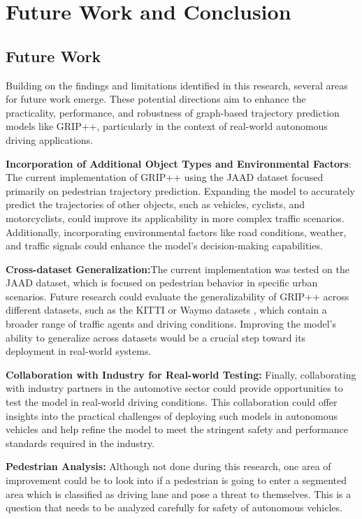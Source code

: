\chapter{Future Work and Conclusion}

\section{Future Work}

\tab Building on the findings and limitations identified in this research, several areas for future work emerge. These potential directions aim to enhance the practicality, performance, and robustness of graph-based trajectory prediction models like GRIP++, particularly in the context of real-world autonomous driving applications.

\textbf{Incorporation of Additional Object Types and Environmental Factors}: The current implementation of GRIP++ using the JAAD dataset focused primarily on pedestrian trajectory prediction. Expanding the model to accurately predict the trajectories of other objects, such as vehicles, cyclists, and motorcyclists, could improve its applicability in more complex traffic scenarios. Additionally, incorporating environmental factors like road conditions, weather, and traffic signals could enhance the model's decision-making capabilities.

\textbf{Cross-dataset Generalization:}The current implementation was tested on the JAAD dataset, which is focused on pedestrian behavior in specific urban scenarios. Future research could evaluate the generalizability of GRIP++ across different datasets, such as the KITTI \cite{Geiger2013IJRR} or Waymo datasets \cite{sun2020scalability}, which contain a broader range of traffic agents and driving conditions. Improving the model's ability to generalize across datasets would be a crucial step toward its deployment in real-world systems.

\textbf{Collaboration with Industry for Real-world Testing:} Finally, collaborating with industry partners in the automotive sector could provide opportunities to test the model in real-world driving conditions. This collaboration could offer insights into the practical challenges of deploying such models in autonomous vehicles and help refine the model to meet the stringent safety and performance standards required in the industry.

\textbf{Pedestrian Analysis:} Although not done during this research, one area of improvement could be to look into if a pedestrian is going to enter a segmented area which is classified as driving lane and pose a threat to themselves. This is a question that needs to be analyzed carefully for safety of autonomous vehicles. 

